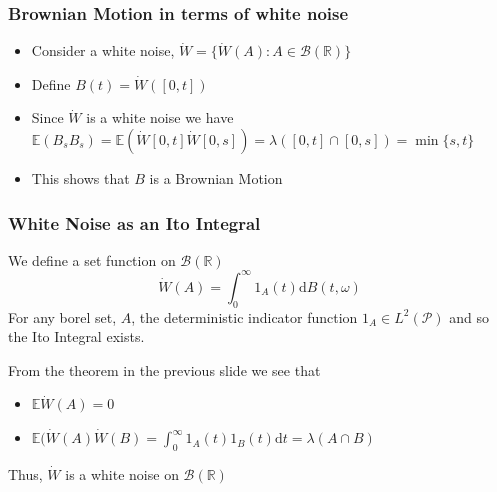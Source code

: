 \documentclass[11pt]{beamer}
\numberwithin{equation}{section}
\newcommand{\R}{\mathbb{R}}
\newcommand{\E}{\mathbb{E}}
\newcommand{\ud}{\ensuremath{\mathrm{d}}}
\begin{document}
\begin{frame}[t]
	\frametitle{Brownian Motion in terms of white noise}
	\begin{itemize}
		\item	Consider a white noise, $\dot{W} = \{\dot{W}(A):A \in \mathscr{B}(\R) \}$
		\item Define $B(t) = \dot{W}([0,t])$
		\item Since $\dot{W}$ is a white noise we have $\mathbb{E}(B_sB_s) = \mathbb{E}(\dot{W}[0,t]\dot{W}[0,s]) = \lambda([0,t]\cap[0,s]) = \min\{s,t\}$
		\item This shows that $B$ is a Brownian Motion 
	\end{itemize}
\end{frame}

\begin{frame}[t]
	\frametitle{White Noise as an Ito Integral}
	We define a set function on $\mathscr{B}(\R)$
	\[
	\dot{W}(A) = \int_0^\infty 1_A(t) \ud B(t,\omega)
	\]
	For any borel set, $A$, the deterministic indicator function $1_A \in L^2(\mathscr{P})$ and so the Ito Integral exists.
	
	From the theorem in the previous slide we see that
	\begin{itemize}
		\item $\E\dot{W}(A) = 0 $
		\item $ \E(\dot{W}(A) \dot{W}(B) = \int_0^\infty 1_A(t)1_B(t) \ud t = \lambda (A \cap B) $
	\end{itemize}
	Thus, $\dot{W}$ is a white noise on $\mathscr{B}(\R)$
	
\end{frame}
\end{document}
